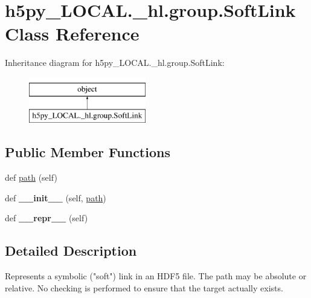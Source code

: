 \hypertarget{classh5py__LOCAL_1_1__hl_1_1group_1_1SoftLink}{}\section{h5py\+\_\+\+L\+O\+C\+A\+L.\+\_\+hl.\+group.\+Soft\+Link Class Reference}
\label{classh5py__LOCAL_1_1__hl_1_1group_1_1SoftLink}
Inheritance diagram for h5py\+\_\+\+L\+O\+C\+A\+L.\+\_\+hl.\+group.\+Soft\+Link\+:\begin{figure}[H]
\begin{center}
\leavevmode
\includegraphics[height=2.000000cm]{classh5py__LOCAL_1_1__hl_1_1group_1_1SoftLink}
\end{center}
\end{figure}
\subsection*{Public Member Functions}
\begin{DoxyCompactItemize}
\item 
def \hyperlink{classh5py__LOCAL_1_1__hl_1_1group_1_1SoftLink_a76d49c628a868d4a1bae830ce43672b4}{path} (self)
\item 
\mbox{\label{classh5py__LOCAL_1_1__hl_1_1group_1_1SoftLink_a1b233c9fb25d92294528026eaef58a6e}} 
def {\bfseries \+\_\+\+\_\+init\+\_\+\+\_\+} (self, \hyperlink{classh5py__LOCAL_1_1__hl_1_1group_1_1SoftLink_a76d49c628a868d4a1bae830ce43672b4}{path})
\item 
\mbox{\label{classh5py__LOCAL_1_1__hl_1_1group_1_1SoftLink_a8bf76cb730b16a3e83b49b7e3ce0bdb1}} 
def {\bfseries \+\_\+\+\_\+repr\+\_\+\+\_\+} (self)
\end{DoxyCompactItemize}


\subsection{Detailed Description}
\begin{DoxyVerb}    Represents a symbolic ("soft") link in an HDF5 file.  The path
    may be absolute or relative.  No checking is performed to ensure
    that the target actually exists.
\end{DoxyVerb}
 

